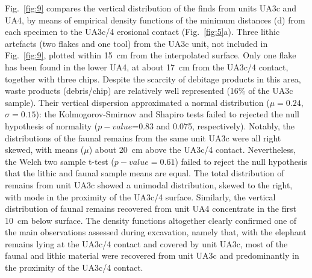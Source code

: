 \documentclass[preprint,authoryear,times]{elsarticle} %
\begin{document}
Fig.~\ref{fig:9} compares the vertical distribution of the finds from units UA3c and UA4, by means of empirical density functions of the minimum distances (d) from each specimen to the UA3c/4 erosional contact (Fig.~\ref{fig:5}a). Three lithic artefacts (two flakes and one tool) from the UA3c unit, not included in Fig.~\ref{fig:9}, plotted within 15~cm from the interpolated surface. Only one flake has been found in the lower UA4, at about 17~cm from the UA3c/4 contact, together with three chips. Despite the scarcity of debitage products in this area, waste products (debris/chip) are relatively well represented (16\% of the UA3c sample). Their vertical dispersion approximated a normal distribution ($\mu=0.24$, $\sigma=0.15$): the Kolmogorov-Smirnov and Shapiro tests failed to rejected the null hypothesis of normality ($p-value$=0.83 and 0.075, respectively). Notably, the distributions of the faunal remains from the same unit UA3c were all right skewed, with means ($\mu$) about 20~cm above the UA3c/4 contact. Nevertheless, the Welch two sample t-test ($p-value=0.61$) failed to reject the null hypothesis that the lithic and faunal sample means are equal. The total distribution of remains from unit UA3c showed a unimodal distribution, skewed to the right, with mode in the proximity of the UA3c/4 surface. Similarly, the vertical distribution of faunal remains recovered from unit UA4 concentrate in the first 10~cm below surface. The density functions altogether clearly confirmed one of the main observations assessed during excavation, namely that, with the elephant remains lying at the UA3c/4 contact and covered by unit UA3c, most of the faunal and lithic material were recovered from unit UA3c and predominantly in the proximity of the UA3c/4 contact.
\end{document}

